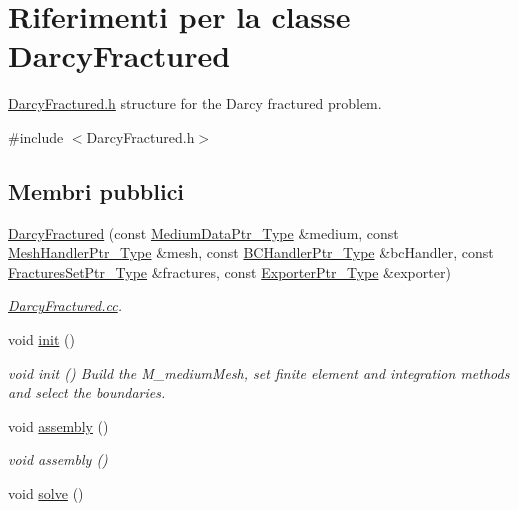 \hypertarget{classDarcyFractured}{\section{Riferimenti per la classe Darcy\-Fractured}
\label{classDarcyFractured}
}


\hyperlink{DarcyFractured_8h}{Darcy\-Fractured.\-h} structure for the Darcy fractured problem.  




{\ttfamily \#include $<$Darcy\-Fractured.\-h$>$}

\subsection*{Membri pubblici}
\begin{DoxyCompactItemize}
\item 
\hyperlink{classDarcyFractured_accc03f979ab787754e26d9f06b553c96}{Darcy\-Fractured} (const \hyperlink{MediumData_8h_ab4e5446269b79f019405fbe1b6e4b1fe}{Medium\-Data\-Ptr\-\_\-\-Type} \&medium, const \hyperlink{MeshHandler_8h_a1e5fc39dfda19e81b21756ab7719ef4c}{Mesh\-Handler\-Ptr\-\_\-\-Type} \&mesh, const \hyperlink{BCHandler_8h_aa175884cb453788647f17f2230a2a762}{B\-C\-Handler\-Ptr\-\_\-\-Type} \&bc\-Handler, const \hyperlink{FracturesSet_8h_ac29a2a91d3af77fb459980a7db47f420}{Fractures\-Set\-Ptr\-\_\-\-Type} \&fractures, const \hyperlink{Exporter_8h_ac9d7f94fea8b91459a536bfaa2f3910c}{Exporter\-Ptr\-\_\-\-Type} \&exporter)
\begin{DoxyCompactList}\small\item\em \hyperlink{DarcyFractured_8cc}{Darcy\-Fractured.\-cc}. \end{DoxyCompactList}\item 
void \hyperlink{classDarcyFractured_a7832c9317b9764da96fc8ee112860824}{init} ()
\begin{DoxyCompactList}\small\item\em void init () Build the M\-\_\-medium\-Mesh, set finite element and integration methods and select the boundaries. \end{DoxyCompactList}\item 
void \hyperlink{classDarcyFractured_a1e218bc0eda8f55db644dda95503491b}{assembly} ()
\begin{DoxyCompactList}\small\item\em void assembly () \end{DoxyCompactList}\item 
void \hyperlink{classDarcyFractured_a074b6ec717f783c731b2be89f6528cc0}{solve} ()

\end{DoxyCompactItemize}
